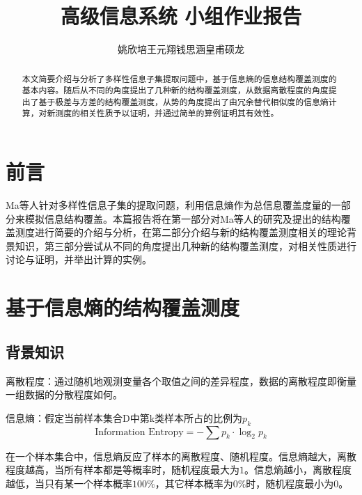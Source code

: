 \documentclass{../notes}
\title{高级信息系统 小组作业报告}
\author{姚欣培\;王元翔\;钱思涵\;皇甫硕龙}
\begin{document}
    \maketitle
    \begin{abstract}
        本文简要介绍与分析了多样性信息子集提取问题中，基于信息熵的信息结构覆盖测度的基本内容。随后从不同的角度提出了几种新的结构覆盖测度，从数据离散程度的角度提出了基于极差与方差的结构覆盖测度，从势的角度提出了由冗余替代相似度的信息熵计算，对新测度的相关性质予以证明，并通过简单的算例证明其有效性。
    \end{abstract}

    \section*{前言}

    Ma等人针对多样性信息子集的提取问题，利用信息熵作为总信息覆盖度量的一部分来模拟信息结构覆盖。本篇报告将在第一部分对Ma等人的研究及提出的结构覆盖测度进行简要的介绍与分析，在第二部分介绍与新的结构覆盖测度相关的理论背景知识，第三部分尝试从不同的角度提出几种新的结构覆盖测度，对相关性质进行讨论与证明，并举出计算的实例。

    \section{基于信息熵的结构覆盖测度}

    \subsection*{背景知识}

    \begin{definition}
        离散程度：通过随机地观测变量各个取值之间的差异程度，数据的离散程度即衡量一组数据的分散程度如何。
    \end{definition}

    \begin{definition}
        信息熵：假定当前样本集合D中第k类样本所占的比例为$p_k$
        \begin{equation}
            \text{Information\ Entropy}=-\sum{p_k\cdot\log_2{p_k}}
        \end{equation}

        在一个样本集合中，信息熵反应了样本的离散程度、随机程度。信息熵越大，离散程度越高，当所有样本都是等概率时，随机程度最大为$1$。信息熵越小，离散程度越低，当只有某一个样本概率$100\%$，其它样本概率为$0\%$时，随机程度最小为$0$。
    \end{definition}
\end{document}
